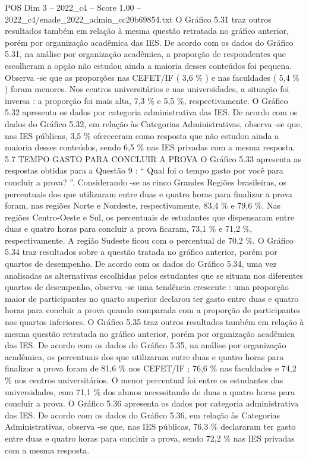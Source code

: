\begin{textsample}{POS Dim 3 – 2022\_c4 – Score 1.00 – 2022\_c4/enade\_2022\_admin\_cc20b69854.txt}
O Gráfico 5.31 traz outros resultados também em relação à mesma questão retratada no gráfico anterior, porém por organização acadêmica das IES.
De acordo com os dados do Gráfico 5.31, na análise por organização acadêmica, a proporção de respondentes que escolheram a opção não estudou ainda a maioria desses conteúdos foi pequena.
Observa -se que as proporções nas CEFET/IF ( 3,6 \% ) e nas faculdades ( 5,4 \% ) foram menores.
Nos centros universitários e nas universidades, a situação foi inversa : a proporção foi mais alta, 7,3 \% e 5,5 \%, respectivamente.
O Gráfico 5.32 apresenta os dados por categoria administrativa das IES.
De acordo com os dados do Gráfico 5.32, em relação às Categorias Administrativas, observa -se que, nas IES públicas, 3,5 \% ofereceram como resposta que não estudou ainda a maioria desses conteúdos, sendo 6,5 \% nas IES privadas com a mesma resposta. 5.7 TEMPO GASTO PARA CONCLUIR A PROVA O Gráfico 5.33 apresenta as respostas obtidas para a Questão 9 : “ Qual foi o tempo gasto por você para concluir a prova? ”.
Considerando -se as cinco Grandes Regiões brasileiras, os percentuais dos que utilizaram entre duas e quatro horas para finalizar a prova foram, nas regiões Norte e Nordeste, respectivamente, 83,4 \% e 79,6 \%.
Nas regiões Centro-Oeste e Sul, os percentuais de estudantes que dispensaram entre duas e quatro horas para concluir a prova ficaram, 73,1 \% e 71,2 \%, respectivamente.
A região Sudeste ficou com o percentual de 70,2 \%.
O Gráfico 5.34 traz resultados sobre a questão tratada no gráfico anterior, porém por quartos de desempenho.
De acordo com os dados do Gráfico 5.34, uma vez analisadas as alternativas escolhidas pelos estudantes que se situam nos diferentes quartos de desempenho, observa -se uma tendência crescente : uma proporção maior de participantes no quarto superior declarou ter gasto entre duas e quatro horas para concluir a prova quando comparada com a proporção de participantes nos quartos inferiores.
O Gráfico 5.35 traz outros resultados também em relação à mesma questão retratada no gráfico anterior, porém por organização acadêmica das IES.
De acordo com os dados do Gráfico 5.35, na análise por organização acadêmica, os percentuais dos que utilizaram entre duas e quatro horas para finalizar a prova foram de 81,6 \% nos CEFET/IF ; 76,6 \% nas faculdades e 74,2 \% nos centros universitários.
O menor percentual foi entre os estudantes das universidades, com 71,1 \% dos alunos necessitando de duas a quatro horas para concluir a prova.
O Gráfico 5.36 apresenta os dados por categoria administrativa das IES.
De acordo com os dados do Gráfico 5.36, em relação às Categorias Administrativas, observa -se que, nas IES públicas, 76,3 \% declararam ter gasto entre duas e quatro horas para concluir a prova, sendo 72,2 \% nas IES privadas com a mesma resposta.

\end{textsample}
